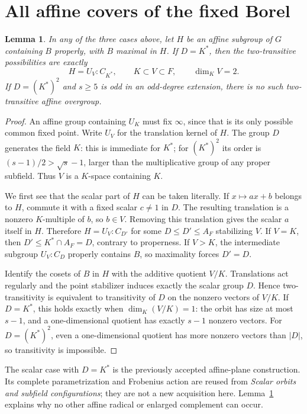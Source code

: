 \documentclass[11pt]{article}
\newtheorem{lemma}{Lemma}\newtheorem{theorem}[lemma]{Theorem}
\begin{document}
\section{All affine covers of the fixed Borel}
\begin{lemma}\label{affine}
In any of the three cases above, let $H$ be an affine subgroup of
$G$ containing $B$ properly, with $B$ maximal in $H$.
If $D=K^*$, then the two-transitive possibilities are exactly
\[
 H=U_V:C_{K^*},\qquad K\subset V\subset F,
 \qquad \dim_K V=2.
\]
If $D=(K^*)^2$ and $s\ge5$ is odd in an odd-degree extension,
there is no such two-transitive affine overgroup.
\end{lemma}
\begin{proof}
An affine group containing $U_K$ must fix $\infty$, since that
is its only possible common fixed point. Write $U_V$ for the
translation kernel of $H$. The group $D$ generates the field $K$:
this is immediate for $K^*$; for $(K^*)^2$ its order is
$(s-1)/2>\sqrt{s}-1$, larger than the multiplicative group of any
proper subfield. Thus $V$ is a $K$-space containing $K$.

We first see that the scalar part of $H$ can be taken literally.
If $x\mapsto ax+b$ belongs to $H$, commute it with a fixed scalar
$c\ne1$ in $D$. The resulting translation is a nonzero $K$-multiple
of $b$, so $b\in V$. Removing this translation gives the scalar
$a$ itself in $H$. Therefore $H=U_V:C_{D'}$ for some
$D\le D'\le A_F$ stabilizing $V$.
If $V=K$, then $D'\le K^*\cap A_F=D$, contrary to properness.
If $V>K$, the intermediate subgroup $U_V:C_D$ properly contains
$B$, so maximality forces $D'=D$.

Identify the cosets of $B$ in $H$ with the additive quotient $V/K$.
Translations act regularly and the point stabilizer induces exactly
the scalar group $D$. Hence two-transitivity is equivalent to
transitivity of $D$ on the nonzero vectors of $V/K$. If $D=K^*$,
this holds exactly when $\dim_K(V/K)=1$: the orbit has size at most
$s-1$, and a one-dimensional quotient has exactly $s-1$ nonzero
vectors. For $D=(K^*)^2$, even a one-dimensional quotient has more
nonzero vectors than $|D|$, so transitivity is impossible.
\end{proof}

The scalar case with $D=K^*$ is the previously accepted affine-plane
construction. Its complete parametrization and Frobenius action are
reused from \emph{Scalar orbits and subfield configurations}; they
are not a new acquisition here. Lemma~\ref{affine} explains why no
other affine radical or enlarged complement can occur.
\end{document}
